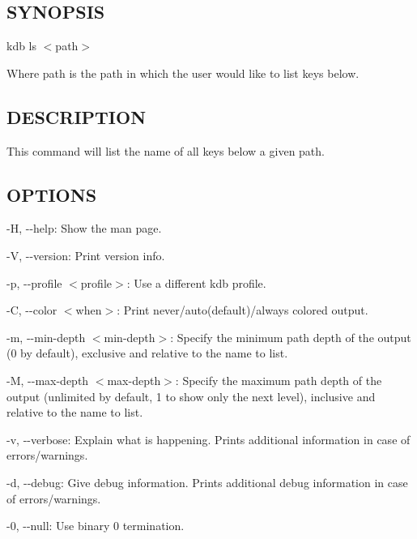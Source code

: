 \subsection*{S\+Y\+N\+O\+P\+S\+IS}

{\ttfamily kdb ls $<$path$>$}

Where {\ttfamily path} is the path in which the user would like to list keys below.

\subsection*{D\+E\+S\+C\+R\+I\+P\+T\+I\+ON}

This command will list the name of all keys below a given path.

\subsection*{O\+P\+T\+I\+O\+NS}


\begin{DoxyItemize}
\item {\ttfamily -\/H}, {\ttfamily -\/-\/help}\+: Show the man page.
\item {\ttfamily -\/V}, {\ttfamily -\/-\/version}\+: Print version info.
\item {\ttfamily -\/p}, {\ttfamily -\/-\/profile $<$profile$>$}\+: Use a different kdb profile.
\item {\ttfamily -\/C}, {\ttfamily -\/-\/color $<$when$>$}\+: Print never/auto(default)/always colored output.
\item {\ttfamily -\/m}, {\ttfamily -\/-\/min-\/depth $<$min-\/depth$>$}\+: Specify the minimum path depth of the output (0 by default), exclusive and relative to the name to list.
\item {\ttfamily -\/M}, {\ttfamily -\/-\/max-\/depth $<$max-\/depth$>$}\+: Specify the maximum path depth of the output (unlimited by default, 1 to show only the next level), inclusive and relative to the name to list.
\item {\ttfamily -\/v}, {\ttfamily -\/-\/verbose}\+: Explain what is happening. Prints additional information in case of errors/warnings.
\item {\ttfamily -\/d}, {\ttfamily -\/-\/debug}\+: Give debug information. Prints additional debug information in case of errors/warnings.
\item {\ttfamily -\/0}, {\ttfamily -\/-\/null}\+: Use binary 0 termination.
\end{DoxyItemize}

